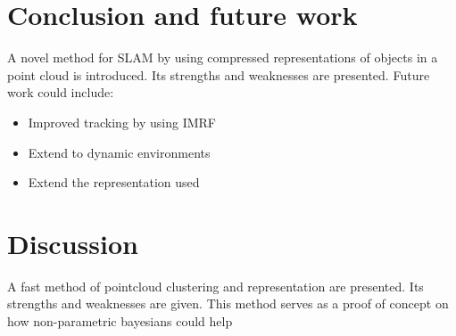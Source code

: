 \documentclass[twoside,hidelinks]{article}
\begin{document}
\section{Conclusion and future work}
\label{sec:discussion}

A novel method for SLAM by using compressed representations of objects in a point cloud is introduced. Its strengths and weaknesses are presented. Future work could include:
\begin{itemize}
    \item Improved tracking by using IMRF
    \item Extend to dynamic environments
    \item Extend the representation used
\end{itemize}

\section{Discussion}

A fast method of pointcloud clustering and representation are presented. Its strengths and weaknesses are given. This method serves as a proof of concept on how non-parametric bayesians could help 
\end{document}
